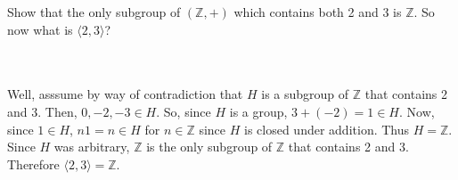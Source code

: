 Show that the only subgroup of $(\mathbb{Z},+)$ which contains both 2 and 3 is $\mathbb{Z}$. So now what
is $\langle2,3\rangle$?\\\\

\begin{solution}\renewcommand{\qedsymbol}{}\ \\
    Well, asssume by way of contradiction that $H$ is a subgroup of $\mathbb{Z}$ that contains 2 and 3.
    Then, $0,-2,-3\in H$. So, since $H$ is a group, $3+(-2)=1\in H$. Now, since $1\in H$, $n1=n\in H$
    for $n\in\mathbb{Z}$ since $H$ is closed under addition. Thus $H=\mathbb{Z}$. Since $H$ was
    arbitrary, $\mathbb{Z}$ is the only subgroup of $\mathbb{Z}$ that contains 2 and 3. Therefore
    $\langle2,3\rangle=\mathbb{Z}$.

\end{solution}